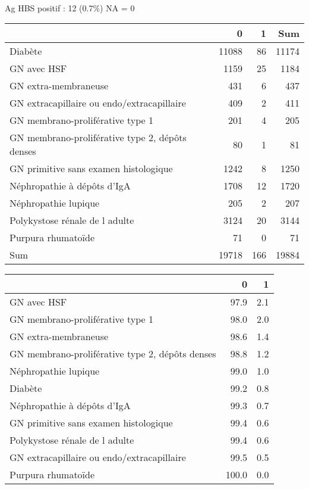 \documentclass[11pt,a4paper]{article}\usepackage[]{graphicx}\usepackage[]{color}
\begin{document}
~\\

Ag HBS positif : 12 (0.7\%) NA = 0

\begin{table}[H]
\centering
\begin{tabular}{lrrr}
  \hline
 & 0 & 1 & Sum \\ 
  \hline
Diabète & 11088 & 86 & 11174 \\ 
  GN avec HSF & 1159 & 25 & 1184 \\ 
  GN extra-membraneuse & 431 & 6 & 437 \\ 
  GN extracapillaire ou endo/extracapillaire & 409 & 2 & 411 \\ 
  GN membrano-proliférative type 1 & 201 & 4 & 205 \\ 
  GN membrano-proliférative type 2, dépôts denses & 80 & 1 & 81 \\ 
  GN primitive sans examen histologique & 1242 & 8 & 1250 \\ 
  Néphropathie à dépôts d'IgA & 1708 & 12 & 1720 \\ 
  Néphropathie lupique & 205 & 2 & 207 \\ 
  Polykystose rénale de l adulte & 3124 & 20 & 3144 \\ 
  Purpura rhumatoïde & 71 & 0 & 71 \\ 
  Sum & 19718 & 166 & 19884 \\ 
   \hline
\end{tabular}
\end{table}
\begin{table}[H]
\centering
\begin{tabular}{lrr}
  \hline
 & 0 & 1 \\ 
  \hline
GN avec HSF & 97.9 & 2.1 \\ 
  GN membrano-proliférative type 1 & 98.0 & 2.0 \\ 
  GN extra-membraneuse & 98.6 & 1.4 \\ 
  GN membrano-proliférative type 2, dépôts denses & 98.8 & 1.2 \\ 
  Néphropathie lupique & 99.0 & 1.0 \\ 
  Diabète & 99.2 & 0.8 \\ 
  Néphropathie à dépôts d'IgA & 99.3 & 0.7 \\ 
  GN primitive sans examen histologique & 99.4 & 0.6 \\ 
  Polykystose rénale de l adulte & 99.4 & 0.6 \\ 
  GN extracapillaire ou endo/extracapillaire & 99.5 & 0.5 \\ 
  Purpura rhumatoïde & 100.0 & 0.0 \\ 
   \hline
\end{tabular}
\end{table}
\end{document}
